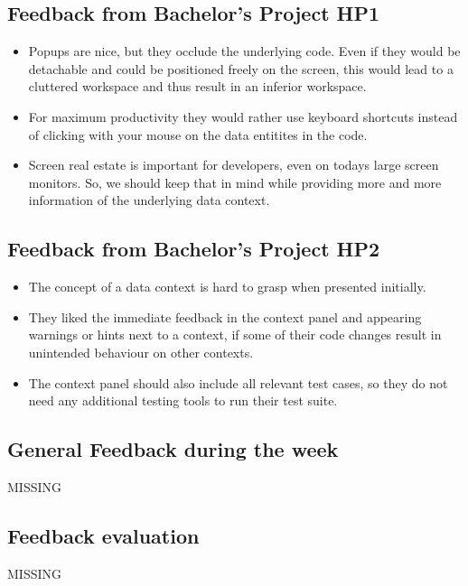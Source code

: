 \subsection{Feedback from Bachelor's Project HP1}
\label{subsec:FeedbackBPHP1}
\begin{itemize}
	\item Popups are nice, but they occlude the underlying code. Even if they would be detachable and could be positioned freely on the screen, this would lead to a cluttered workspace and thus result in an inferior workspace.

	\item For maximum productivity they would rather use keyboard shortcuts instead of clicking with your mouse on the data entitites in the code.

	\item Screen real estate is important for developers, even on todays large screen monitors. So, we should keep that in mind while providing more and more information of the underlying data context.
\end{itemize}

\subsection{Feedback from Bachelor's Project HP2}
\label{subsec:FeedbackBPHP2}
\begin{itemize}
	\item The concept of a data context is hard to grasp when presented initially.

	\item They liked the immediate feedback in the context panel and appearing warnings or hints next to a context, if some of their code changes result in unintended behaviour on other contexts.

	\item The context panel should also include all relevant test cases, so they do not need any additional testing tools to run their test suite.
\end{itemize}


\subsection{General Feedback during the week}
\label{subsec:FeedbackWeek}
	MISSING

\subsection{Feedback evaluation}
\label{subsec:FeedbackEvaluation}
	MISSING


